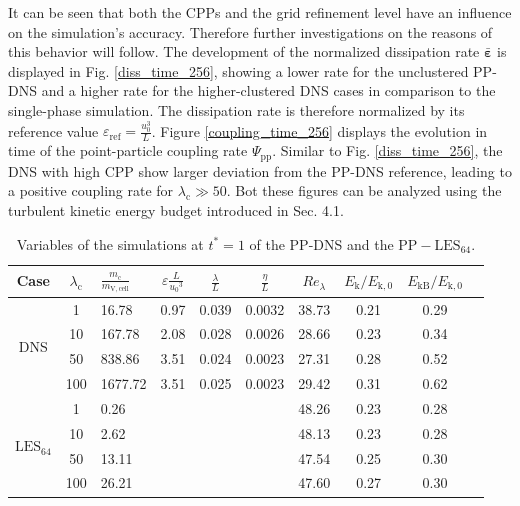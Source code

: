 \documentclass[11pt,a4paper,openany,oneside,parskip=half*]{article}
\renewcommand*\vec[1]{\boldsymbol{#1}}
\begin{document}
It can be seen that both the CPPs and the grid refinement level have an influence on the simulation's accuracy. Therefore further investigations on the reasons of this behavior will follow.
\newline %
The development of the normalized dissipation rate $\bar{\vec{\varepsilon}}$ is displayed in Fig. \ref{diss_time_256}, showing a lower rate for the unclustered PP-DNS and a higher rate for the higher-clustered DNS cases in comparison to the single-phase simulation. The dissipation rate is therefore normalized by its reference value $\varepsilon_\mathrm{ref}=\frac{u_0^3}{L}$.
\newline %
Figure \ref{coupling_time_256} displays the evolution in time of the point-particle coupling rate $\Psi_\mathrm{pp}$. Similar to Fig. \ref{diss_time_256}, the DNS with high CPP show larger deviation from the PP-DNS reference, leading to a positive coupling rate for $\lambda_\mathrm{c} \gg 50$.
\newline
Bot these figures can be analyzed using the turbulent kinetic energy budget introduced in Sec. 4.1.
\begin{table}[]
	\begin{center}
	\begin{tabular}{| c | c l | c c c c c c c |}
	\hline
	Case & $\lambda_\mathrm{c}$& $\frac{m_\mathrm{c}}{m_\mathrm{V,cell}}$ &$\varepsilon \frac{L}{{u_0}^3}$ & $\frac{\lambda}{L}$ & $\frac{\eta}{L} $ & $Re_\lambda$ & $E_\mathrm{k}/E_\mathrm{k,0}$ & $E_\mathrm{kB}/E_\mathrm{k,0}$ & \\
	\hline
	\hline
	\multirow{4}{*}{DNS}
	&1 &16.78 & 0.97& 0.039 & 0.0032 & 38.73 & 0.21 & 0.29 &\\
	&10 &167.78 & 2.08 & 0.028 & 0.0026 & 28.66 & 0.23 & 0.34 &\\
	&50 &838.86 & 3.51 & 0.024 & 0.0023 & 27.31 & 0.28 & 0.52 &\\
	&100 &1677.72 & 3.51 & 0.025 & 0.0023 & 29.42 & 0.31 & 0.62 &\\
	\hline
	\hline
	\multirow{4}{*}{$\mathrm{LES_{64}}$}
	&1 & 0.26 & &  &  & 48.26 & 0.23 & 0.28 &\\
	&10 & 2.62 & &  &  & 48.13 & 0.23 & 0.28 &\\
	&50 & 13.11 & &  &  & 47.54 & 0.25 & 0.30 &\\
	&100 & 26.21 & &  &  & 47.60 & 0.27 & 0.30 &\\
	\hline
	\end{tabular}
	\captionsetup{width=0.9\linewidth}
	\caption{Variables of the simulations at $t^*=1$ of the PP-DNS and the $\mathrm{PP-LES_{64}}$.}
	\label{table_values_DNS_LES}
	\end{center}
	\end{table}%
\end{document}
